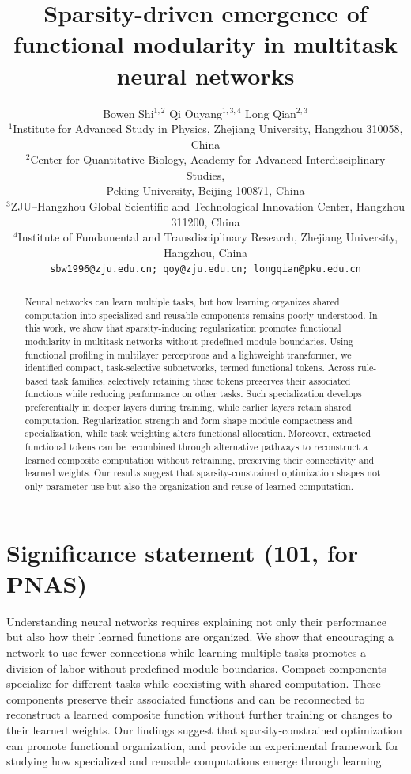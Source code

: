 \documentclass{article}
\title{Sparsity-driven emergence of functional modularity in multitask neural networks}
\author{Bowen Shi$^{1,2}$ \quad Qi Ouyang$^{1,3,4}$ \quad Long Qian$^{2,3}$\\
\small $^1$Institute for Advanced Study in Physics, Zhejiang University, Hangzhou 310058, China\\
\small $^2$Center for Quantitative Biology, Academy for Advanced Interdisciplinary Studies,\\
\small Peking University, Beijing 100871, China\\
\small $^3$ZJU--Hangzhou Global Scientific and Technological Innovation Center, Hangzhou 311200, China\\
\small $^4$Institute of Fundamental and Transdisciplinary Research, Zhejiang University, Hangzhou, China\\
\texttt{sbw1996@zju.edu.cn; qoy@zju.edu.cn; longqian@pku.edu.cn}
}
\begin{document}
\maketitle

\begin{abstract}

Neural networks can learn multiple tasks, but how learning organizes shared computation into specialized and reusable components remains poorly understood. In this work, we show that sparsity-inducing regularization promotes functional modularity in multitask networks without predefined module boundaries. Using functional profiling in multilayer perceptrons and a lightweight transformer, we identified compact, task-selective subnetworks, termed functional tokens. Across rule-based task families, selectively retaining these tokens preserves their associated functions while reducing performance on other tasks. Such specialization develops preferentially in deeper layers during training, while earlier layers retain shared computation. Regularization strength and form shape module compactness and specialization, while task weighting alters functional allocation. Moreover, extracted functional tokens can be recombined through alternative pathways to reconstruct a learned composite computation without retraining, preserving their connectivity and learned weights. Our results suggest that sparsity-constrained optimization shapes not only parameter use but also the organization and reuse of learned computation.

\end{abstract}

\section*{Significance statement (101, for PNAS)}
Understanding neural networks requires explaining not only their performance but also how their learned functions are organized. We show that encouraging a network to use fewer connections while learning multiple tasks promotes a division of labor without predefined module boundaries. Compact components specialize for different tasks while coexisting with shared computation. These components preserve their associated functions and can be reconnected to reconstruct a learned composite function without further training or changes to their learned weights. Our findings suggest that sparsity-constrained optimization can promote functional organization, and provide an experimental framework for studying how specialized and reusable computations emerge through learning.
\end{document}
